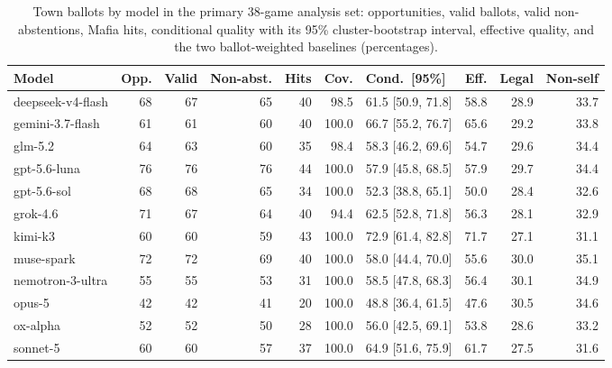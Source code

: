 \documentclass[11pt]{article}
\begin{document}
\begin{table}[H]
\centering\scriptsize
\caption{Town ballots by model in the primary 38-game analysis set: opportunities, valid ballots, valid non-abstentions, Mafia hits, conditional quality with its 95\% cluster-bootstrap interval, effective quality, and the two ballot-weighted baselines (percentages).}
\begin{tabular}{@{}lrrrrrlrrr@{}}
\toprule
Model & Opp. & Valid & Non-abst. & Hits & Cov. & Cond.\ [95\%] & Eff. & Legal & Non-self \\
\midrule
deepseek-v4-flash & 68 & 67 & 65 & 40 & 98.5 & 61.5 [50.9, 71.8] & 58.8 & 28.9 & 33.7 \\
gemini-3.7-flash & 61 & 61 & 60 & 40 & 100.0 & 66.7 [55.2, 76.7] & 65.6 & 29.2 & 33.8 \\
glm-5.2 & 64 & 63 & 60 & 35 & 98.4 & 58.3 [46.2, 69.6] & 54.7 & 29.6 & 34.4 \\
gpt-5.6-luna & 76 & 76 & 76 & 44 & 100.0 & 57.9 [45.8, 68.5] & 57.9 & 29.7 & 34.4 \\
gpt-5.6-sol & 68 & 68 & 65 & 34 & 100.0 & 52.3 [38.8, 65.1] & 50.0 & 28.4 & 32.6 \\
grok-4.6 & 71 & 67 & 64 & 40 & 94.4 & 62.5 [52.8, 71.8] & 56.3 & 28.1 & 32.9 \\
kimi-k3 & 60 & 60 & 59 & 43 & 100.0 & 72.9 [61.4, 82.8] & 71.7 & 27.1 & 31.1 \\
muse-spark & 72 & 72 & 69 & 40 & 100.0 & 58.0 [44.4, 70.0] & 55.6 & 30.0 & 35.1 \\
nemotron-3-ultra & 55 & 55 & 53 & 31 & 100.0 & 58.5 [47.8, 68.3] & 56.4 & 30.1 & 34.9 \\
opus-5 & 42 & 42 & 41 & 20 & 100.0 & 48.8 [36.4, 61.5] & 47.6 & 30.5 & 34.6 \\
ox-alpha & 52 & 52 & 50 & 28 & 100.0 & 56.0 [42.5, 69.1] & 53.8 & 28.6 & 33.2 \\
sonnet-5 & 60 & 60 & 57 & 37 & 100.0 & 64.9 [51.6, 75.9] & 61.7 & 27.5 & 31.6 \\
\bottomrule
\end{tabular}
\end{table}
\end{document}
